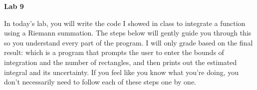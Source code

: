 \documentclass{article}
\begin{document}
\fancyfoot[C]{\thepage}
\vspace*{0cm}
\begin{center}
	{\LARGE \textbf{Lab 9}}\\
	\vspace{.25cm}
\end{center}
In today's lab, you will write the code I showed in class to integrate a function using a Riemann summation. The steps below will gently guide you through this so you understand every part of the program. I will only grade based on the final result: which is a program that prompts the user to enter the bounds of integration and the number of rectangles, and then prints out the estimated integral and its uncertainty. If you feel like you know what you're doing, you don't necessarily need to follow each of these steps one by one.
\end{document}
